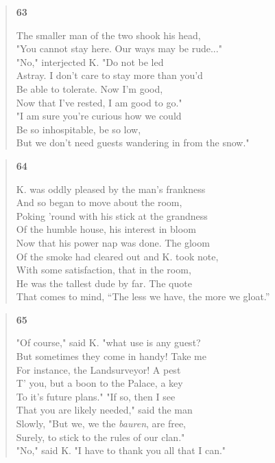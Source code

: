 \documentclass{article}
\begin{document}
\begin{verse}
  \begin{center}
    \textbf{63} \\
  \end{center}
  The smaller man of the two shook his head, \\
  "You cannot stay here. Our ways may be rude..." \\
  "No," interjected K. "Do not be led \\
  Astray. I don't care to stay more than you'd \\
  Be able to tolerate. Now I'm good, \\
  Now that I've rested, I am good to go." \\
  "I am sure you're curious how we could \\
  Be so inhospitable, be so low, \\
  But we don't need guests wandering in from the snow."
\end{verse}
\newpage
\begin{verse}
  \begin{center}
    \textbf{64} \\
  \end{center}
  K. was oddly pleased by the man's frankness \\
  And so began to move about the room, \\
  Poking 'round with his stick at the grandness \\
  Of the humble house, his interest in bloom \\
  Now that his power nap was done. The gloom \\
  Of the smoke had cleared out and K. took note, \\
  With some satisfaction, that in the room, \\
  He was the tallest dude by far. The quote \\
  That comes to mind, ``The less we have, the more we gloat.''
\end{verse}
\begin{verse}
  \begin{center}
    \textbf{65} \\
  \end{center}
  "Of course," said K. "what use is any guest? \\  
  But sometimes they come in handy! Take me \\
  For instance, the Landsurveyor! A pest \\
  T' you, but a boon to the Palace, a key \\
  To it's future plans." "If so, then I see \\
  That you are likely needed," said the man \\
  Slowly, "But we, we the \textit{bauren}, are free, \\
  Surely, to stick to the rules of our clan." \\
  "No," said K. "I have to thank you all that I can." \\
\end{verse}
\end{document}
